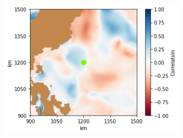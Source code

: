 \documentclass[11pt, english]{article}
\begin{document}
\begin{multicols}{2}
\begin{figure}
\begin{subfigure}{0.33\textwidth}
		\includegraphics[width=\textwidth]{coord-2-s}
	\end{subfigure}
\end{figure}


\end{multicols}
\end{document}
